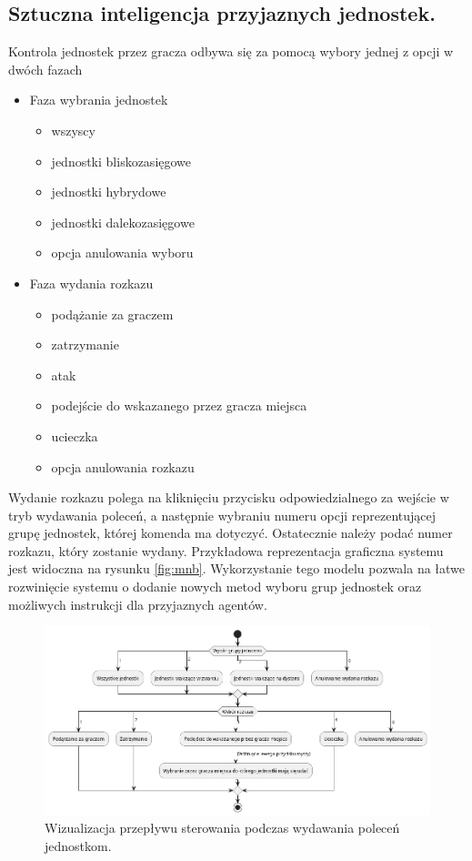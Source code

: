 \subsection{Sztuczna inteligencja przyjaznych jednostek.}

Kontrola jednostek przez gracza odbywa się za pomocą wybory jednej z opcji w dwóch fazach
\begin{itemize}
\item Faza wybrania jednostek
  \begin{itemize}
    \item wszyscy
    \item jednostki bliskozasięgowe 
    \item jednostki hybrydowe
    \item jednostki dalekozasięgowe
    \item opcja anulowania wyboru
  \end{itemize}

\item Faza wydania rozkazu
  \begin{itemize}
    \item podążanie za graczem
    \item zatrzymanie
    \item atak
    \item podejście do wskazanego przez gracza miejsca
    \item ucieczka
    \item opcja anulowania rozkazu
  \end{itemize}
\end{itemize}

Wydanie rozkazu polega na kliknięciu przycisku odpowiedzialnego za wejście w tryb wydawania poleceń, a następnie
wybraniu numeru opcji reprezentującej grupę jednostek, której komenda ma dotyczyć. Ostatecznie należy podać numer rozkazu, który zostanie wydany.
Przykładowa reprezentacja graficzna systemu jest widoczna na rysunku \ref{fig:mnb}.
Wykorzystanie tego modelu pozwala na łatwe rozwinięcie systemu o dodanie nowych metod wyboru grup jednostek oraz możliwych instrukcji dla przyjaznych agentów.

\begin{figure}[h]
\centering
\includegraphics[width=1\textwidth]{uml/commands}
\caption{Wizualizacja przepływu sterowania podczas wydawania poleceń jednostkom.}
\end{figure}
